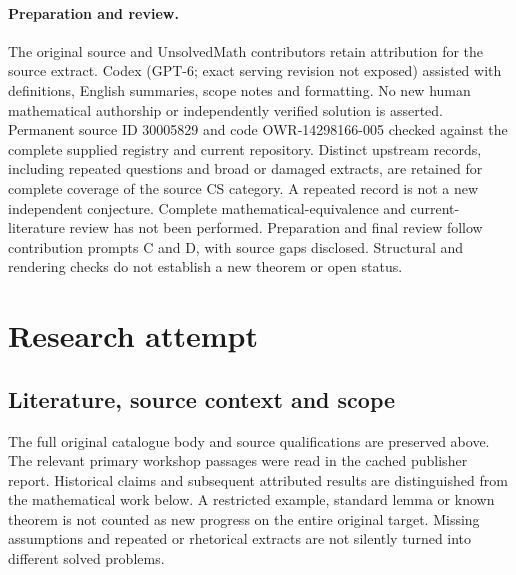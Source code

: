 \documentclass[11pt]{article}
\begin{document}
\paragraph{Preparation and review.}
The original source and UnsolvedMath contributors retain attribution for the source extract. Codex (GPT-6; exact serving revision not exposed) assisted with definitions, English summaries, scope notes and formatting. No new human mathematical authorship or independently verified solution is asserted. Permanent source ID 30005829 and code OWR-14298166-005 checked against the complete supplied registry and current repository. Distinct upstream records, including repeated questions and broad or damaged extracts, are retained for complete coverage of the source CS category. A repeated record is not a new independent conjecture. Complete mathematical-equivalence and current-literature review has not been performed. Preparation and final review follow contribution prompts C and D, with source gaps disclosed. Structural and rendering checks do not establish a new theorem or open status.
\label{end:30005829}

\section{Research attempt}
\subsection{Literature, source context and scope}
The full original catalogue body and source qualifications are preserved above. The relevant primary workshop passages were read in the cached publisher report. Historical claims and subsequent attributed results are distinguished from the mathematical work below. A restricted example, standard lemma or known theorem is not counted as new progress on the entire original target. Missing assumptions and repeated or rhetorical extracts are not silently turned into different solved problems.
\end{document}
